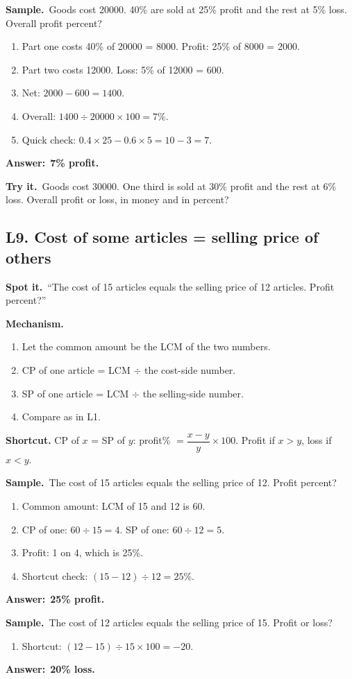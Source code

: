 \documentclass[11pt,a4paper]{article}
\let\oldsubsection\subsection
\renewcommand{\subsection}{\needspace{9\baselineskip}\oldsubsection}
\newcommand{\spot}{\textbf{\color{ember}Spot it.}\ }
\newcommand{\mech}{\textbf{\color{ember}Mechanism.}\ }
\newif\ifkeepsamp
\newcommand{\ans}[1]{\par\nopagebreak\noindent\textbf{\color{ember}Answer:}\ \textbf{#1}\par}
\newcommand{\samp}{\ifkeepsamp\needspace{4\baselineskip}\fi\textbf{\color{ember}Sample.}\ }
\newcommand{\tryit}[1]{\textbf{\color{ember}Try it.}\ #1}
\begin{document}
\samp Goods cost 20000. 40\% are sold at 25\% profit and the rest at 5\% loss. Overall profit percent?
\begin{enumerate}
\item Part one costs 40\% of 20000 = 8000. Profit: 25\% of 8000 = 2000.
\item Part two costs 12000. Loss: 5\% of 12000 = 600.
\item Net: $2000 - 600 = 1400$.
\item Overall: $1400 \div 20000 \times 100 = 7\%$.
\item Quick check: $0.4 \times 25 - 0.6 \times 5 = 10 - 3 = 7$.
\end{enumerate}
\ans{7\% profit.}

\tryit Goods cost 30000. One third is sold at 30\% profit and the rest at 6\% loss. Overall profit or loss, in money and in percent?

\subsection{L9. Cost of some articles = selling price of others}
\spot ``The cost of 15 articles equals the selling price of 12 articles. Profit percent?''

\mech
\begin{enumerate}
\item Let the common amount be the LCM of the two numbers.
\item CP of one article = LCM $\div$ the cost-side number.
\item SP of one article = LCM $\div$ the selling-side number.
\item Compare as in L1.
\end{enumerate}
\textbf{Shortcut.} CP of $x$ = SP of $y$: profit\% $=\dfrac{x - y}{y}\times 100$. Profit if $x > y$, loss if $x < y$.

\samp The cost of 15 articles equals the selling price of 12. Profit percent?
\begin{enumerate}
\item Common amount: LCM of 15 and 12 is 60.
\item CP of one: $60 \div 15 = 4$. SP of one: $60 \div 12 = 5$.
\item Profit: 1 on 4, which is 25\%.
\item Shortcut check: $(15 - 12) \div 12 = 25\%$.
\end{enumerate}
\ans{25\% profit.}

\samp The cost of 12 articles equals the selling price of 15. Profit or loss?
\begin{enumerate}
\item Shortcut: $(12 - 15) \div 15 \times 100 = -20$.
\end{enumerate}
\ans{20\% loss.}
\end{document}

